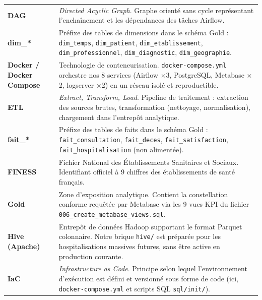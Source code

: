 \documentclass[12pt,a4paper]{report}
\begin{document}
\begin{longtable}{@{} p{3.8cm} p{10.8cm} @{}}
\textbf{DAG} &
    \textit{Directed Acyclic Graph}. Graphe orienté sans cycle représentant
    l'enchaînement et les dépendances des tâches Airflow. \\[4pt]

\textbf{dim\_*} &
    Préfixe des tables de dimensions dans le schéma Gold :
    \texttt{dim\_temps}, \texttt{dim\_patient}, \texttt{dim\_etablissement},
    \texttt{dim\_professionnel}, \texttt{dim\_diagnostic}, \texttt{dim\_geographie}. \\[4pt]

\textbf{Docker / Docker Compose} &
    Technologie de conteneurisation. \texttt{docker-compose.yml} orchestre
    nos 8 services (Airflow $\times$3, PostgreSQL, Metabase $\times$2, logserver $\times$2)
    en un réseau isolé et reproductible. \\[4pt]

\textbf{ETL} &
    \textit{Extract, Transform, Load}. Pipeline de traitement : extraction
    des sources brutes, transformation (nettoyage, normalisation), chargement
    dans l'entrepôt analytique. \\[4pt]

\textbf{fait\_*} &
    Préfixe des tables de faits dans le schéma Gold : \texttt{fait\_consultation},
    \texttt{fait\_deces}, \texttt{fait\_satisfaction}, \texttt{fait\_hospitalisation}
    (non alimentée). \\[4pt]

\textbf{FINESS} &
    Fichier National des Établissements Sanitaires et Sociaux. Identifiant
    officiel à 9 chiffres des établissements de santé français. \\[4pt]

\textbf{Gold} &
    Zone d'exposition analytique. Contient la constellation conforme
    requêtée par Metabase via les 9 vues KPI du fichier
    \texttt{006\_create\_metabase\_views.sql}. \\[4pt]

\textbf{Hive (Apache)} &
    Entrepôt de données Hadoop supportant le format Parquet colonnaire.
    Notre brique \texttt{hive/} est préparée pour les hospitalisations
    massives futures, sans être active en production courante. \\[4pt]

\textbf{IaC} &
    \textit{Infrastructure as Code}. Principe selon lequel l'environnement
    d'exécution est défini et versionné sous forme de code (ici,
    \texttt{docker-compose.yml} et scripts SQL \texttt{sql/init/}). \\[4pt]


\end{longtable}
\end{document}
